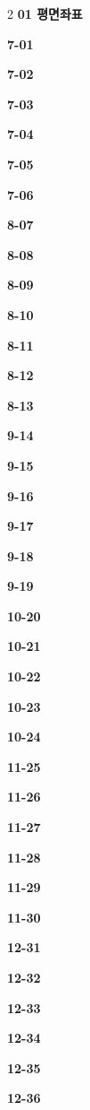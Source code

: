 \documentclass[10pt,a4paper]{article}
\begin{document}
\begin{multicols}{2}\small
\noindent\textbf{01 평면좌표}\par\smallskip
\noindent\textbf{7-01}\ \par
\noindent\textbf{7-02}\ \par
\noindent\textbf{7-03}\ \par
\noindent\textbf{7-04}\ \par
\noindent\textbf{7-05}\ \par
\noindent\textbf{7-06}\ \par
\noindent\textbf{8-07}\ \par
\noindent\textbf{8-08}\ \par
\noindent\textbf{8-09}\ \par
\noindent\textbf{8-10}\ \par
\noindent\textbf{8-11}\ \par
\noindent\textbf{8-12}\ \par
\noindent\textbf{8-13}\ \par
\noindent\textbf{9-14}\ \par
\noindent\textbf{9-15}\ \par
\noindent\textbf{9-16}\ \par
\noindent\textbf{9-17}\ \par
\noindent\textbf{9-18}\ \par
\noindent\textbf{9-19}\ \par
\noindent\textbf{10-20}\ \par
\noindent\textbf{10-21}\ \par
\noindent\textbf{10-22}\ \par
\noindent\textbf{10-23}\ \par
\noindent\textbf{10-24}\ \par
\noindent\textbf{11-25}\ \par
\noindent\textbf{11-26}\ \par
\noindent\textbf{11-27}\ \par
\noindent\textbf{11-28}\ \par
\noindent\textbf{11-29}\ \par
\noindent\textbf{11-30}\ \par
\noindent\textbf{12-31}\ \par
\noindent\textbf{12-32}\ \par
\noindent\textbf{12-33}\ \par
\noindent\textbf{12-34}\ \par
\noindent\textbf{12-35}\ \par
\noindent\textbf{12-36}\ \par

\end{multicols}
\end{document}
